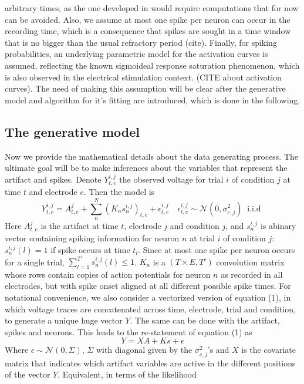 \documentclass[12pt,letterpaper,fleqn]{article}
\begin{document}
arbitrary times, as the one developed in \cite{EkanadhamTS11} would require computations that for now can be avoided.  Also, we assume at most one spike per neuron can occur in the recording time, which is a consequence that spikes are sought in a time window that is no bigger than the usual refractory period (cite). Finally, for spiking probabilities, an underlying parametric model for the activation curves is assumed, reflecting the known sigmoideal response saturation phenomenon, which is also observed in the electrical stimulation context. (CITE about activation curves). The need of making this assumption will be clear after the generative model and algorithm for it's fitting are introduced, which is done in the following. 


\subsection{The generative model}
Now we provide the mathematical details about the data generating process. The ultimate goal will be to make inferences about the variables that represent the artifact and spikes.
 Denote $Y_{t,e}^{i,j}$ the observed voltage for trial $i$ of condition $j$ at time $t$ and electrode $e$. Then the model is
\begin{equation} Y_{t,e}^{i,j}=A_{t,e}^j+\sum_n^N (K_n s_n^{i,j})_{t,e}+\epsilon_{t,e}^{i,j}\quad\epsilon_{t,e}^{i,j} \sim \mathcal{N}\left(0,\sigma^2_{e,j}\right) \;\; \text{i.i.d }\end{equation}
Here $A_{t,e}^j$  is the artifact at time $t$, electrode $j$ and condition $j$, and $s_n^{i,j}$ is abinary vector containing spiking information for neuron $n$ at trial $i$ of condition $j$: $s_n^{i,j}(l)=1$ if spike occurs at time $t_{l}$. Since at most one spike per neuron occurs for a single trial, $ \sum_{l=1}^{T'}s_n^{i,j}(l)\leq1$. $K_n$ is a $(T\times E, T')$ convolution matrix whose rows contain copies of action potentials for neuron $n$ as recorded in all electrodes, but with spike onset aligned at all different possible spike times. For notational convenience, we also consider a vectorized version of equation (1), in which voltage traces are concatenated across time, electrode, trial and condition, to generate a unique huge vector $Y$. The same can be done with the artifact, spikes and neurons. This leads to the re-statement of equation (1) as
\begin{equation}
Y=XA+Ks+\epsilon
\end{equation}
Where $\epsilon \sim \mathcal{N}(0,\Sigma)$, $\Sigma$ with diagonal given by the $\sigma^2_{e,j}$'s  and $X$ is the covariate matrix that indicates which artifact variables are active in the different positions of the vector $Y$. Equivalent, in terms of the likelihood
\end{document}
